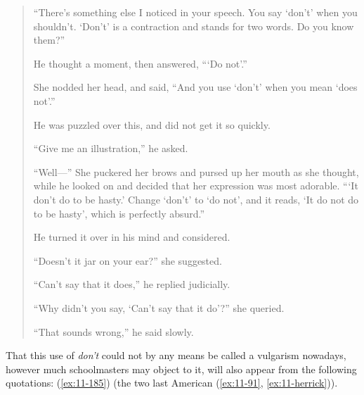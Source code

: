 \begin{quote}``There's something else I noticed in your speech. You say `don't' when you shouldn't. `Don't' is a contraction and stands for two words. Do you know them?''

He thought a moment, then answered, ``‘Do not'.''

She nodded her head, and said, ``And you use `don't' when you mean `does not'.''

He was puzzled over this, and did not get it so quickly.

``Give me an illustration,'' he asked.

``Well---'' She puckered her brows and pursed up her mouth as she thought, while he looked on and decided that her expression was most adorable. ``‘It don't do to be hasty.' Change `don't' to `do not', and it reads, `It do not do to be hasty', which is perfectly absurd.''

He turned it over in his mind and considered.

``Doesn't it jar on your ear?'' she suggested.

``Can't say that it does,'' he replied judicially. %

``Why didn't you say, `Can't say that it do'?'' she queried.

``That sounds wrong,'' he said slowly.\end{quote} %

That this use of \textit{don't} could not by any means be called a vulgarism nowadays, however much schoolmasters may object to it, will also appear from the following quotations: (\ref{ex:11-185}) (the two last American (\ref{ex:11-91}, \ref{ex:11-herrick})).

